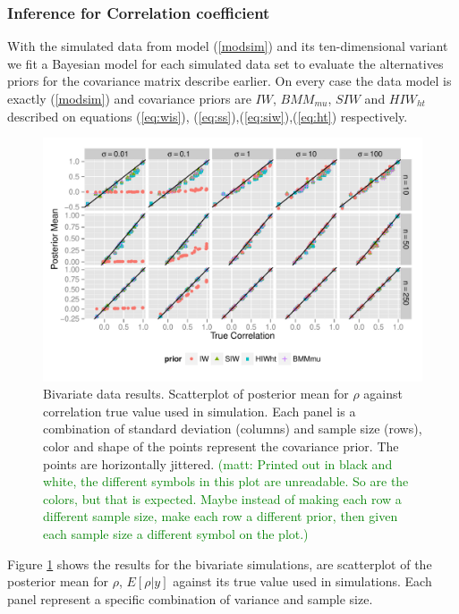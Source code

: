 \documentclass[a4paper]{article}
\newcommand{\matt}[1]{\textcolor{green}{(matt: #1)}}
\begin{document}
\subsubsection{Inference for Correlation coefficient}

With the simulated data from model (\ref{modsim}) and its ten-dimensional variant we fit a Bayesian model for each simulated data set to evaluate the alternatives priors for the covariance matrix describe earlier.  On every case the data model is exactly (\ref{modsim}) and covariance priors are $IW$, $BMM_{mu}$, $SIW$ and $HIW_{ht}$ described on equations (\ref{eq:wis}), (\ref{eq:ss}),(\ref{eq:siw}),(\ref{eq:ht}) respectively.   
\begin{figure}[hbtp]
   \centering
   \includegraphics[width=\textwidth] {fig_rho_d2} 
    \vspace{-.5in}
   \caption{Bivariate data results. Scatterplot of posterior mean for $\rho$  against correlation true value used in simulation. Each panel is a combination of standard deviation (columns) and sample size (rows),  color and shape of the points represent the covariance prior. The points are horizontally jittered. \label{rhod2} \matt{Printed out in black and white, the different symbols in this plot are unreadable. So are the colors, but that is expected. Maybe instead of making each row a different sample size, make each row a different prior, then given each sample size a different symbol on the plot.}}
\end{figure}

Figure \ref{rhod2} shows the results for the bivariate simulations, are scatterplot of the posterior mean for $\rho$, $E[\rho\vert y]$ against its true value used in simulations.  Each panel represent a specific combination of variance and sample size.  
\end{document}
